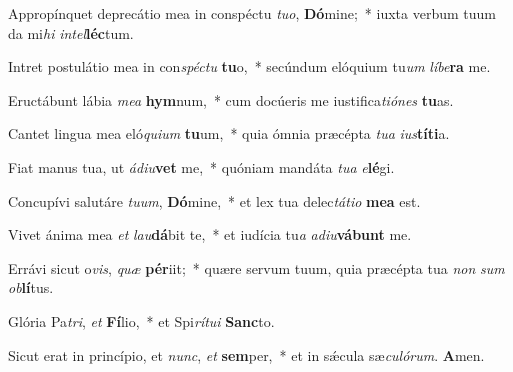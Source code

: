 \item Appropínquet deprecátio mea in conspéctu \textit{tuo}, \textbf{Dó}mine;~* iuxta verbum tuum da mi\textit{hi} \textit{intel}\textbf{léc}tum.

\item Intret postulátio mea in con\textit{spéctu} \textbf{tu}o,~* secúndum elóquium tu\textit{um} \textit{líbe}\textbf{ra} me.

\item Eructábunt lábia \textit{mea} \textbf{hym}num,~* cum docúeris me iustifica\textit{tiónes} \textbf{tu}as.

\item Cantet lingua mea eló\textit{quium} \textbf{tu}um,~* quia ómnia præcépta \textit{tua} \textit{ius}\textbf{tí}\textbf{ti}a.

\item Fiat manus tua, ut \textit{ádiu}\textbf{vet} me,~* quóniam mandáta \textit{tua} \textit{e}\textbf{lé}gi.

\item Concupívi salutáre \textit{tuum}, \textbf{Dó}mine,~* et lex tua delec\textit{tátio} \textbf{me}\textbf{a} est.

\item Vivet ánima mea \textit{et} \textit{lau}\textbf{dá}bit te,~* et iudícia tu\textit{a} \textit{adiu}\textbf{vá}\textbf{bunt} me.

\item Errávi sicut o\textit{vis}, \textit{quæ} \textbf{pér}iit;~* quære servum tuum, quia præcépta tua \textit{non} \textit{sum} \textit{ob}\textbf{lí}tus.

\item Glória Pa\textit{tri}, \textit{et} \textbf{Fí}lio,~* et Spi\textit{rítui} \textbf{Sanc}to.

\item Sicut erat in princípio, et \textit{nunc}, \textit{et} \textbf{sem}per,~* et in sǽcula sæ\textit{culórum}. \textbf{A}men.